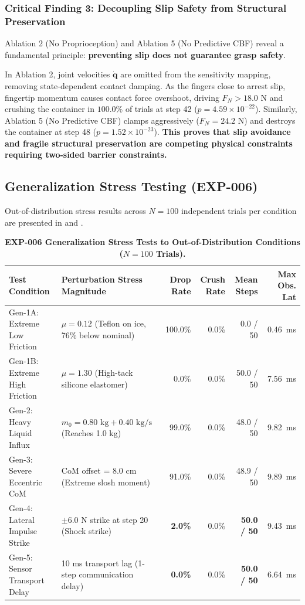 \subsubsection{Critical Finding 3: Decoupling Slip Safety from Structural Preservation}
Ablation 2 (No Proprioception) and Ablation 5 (No Predictive CBF) reveal a fundamental principle: \textbf{preventing slip does not guarantee grasp safety}.

In Ablation 2, joint velocities $\dot{\mathbf{q}}$ are omitted from the sensitivity mapping, removing state-dependent contact damping. As the fingers close to arrest slip, fingertip momentum causes contact force overshoot, driving $F_N > 18.0\text{ N}$ and crushing the container in $100.0\%$ of trials at step 42 ($p = 4.59 \times 10^{-22}$). Similarly, Ablation 5 (No Predictive CBF) clamps aggressively ($F_N = 24.2\text{ N}$) and destroys the container at step 48 ($p = 1.52 \times 10^{-23}$). \textbf{This proves that slip avoidance and fragile structural preservation are competing physical constraints requiring two-sided barrier constraints.}

\subsection{Generalization Stress Testing (EXP-006)}
Out-of-distribution stress results across $N = 100$ independent trials per condition are presented in  and .

\begin{table}[t]
\centering
\caption{\textbf{EXP-006 Generalization Stress Tests to Out-of-Distribution Conditions ($N=100$ Trials).}}
\label{tab:generalization}
\small
\begin{tabular}{llrrrr}
\toprule
\textbf{Test Condition} & \textbf{Perturbation Stress Magnitude} & \textbf{Drop Rate} & \textbf{Crush Rate} & \textbf{Mean Steps} & \textbf{Max Obs. Lat} \\
\midrule
Gen-1A: Extreme Low Friction & $\mu = 0.12$ (Teflon on ice, 76\% below nominal) & 100.0\% & 0.0\% & 0.0 / 50 & 0.46~ms \\
Gen-1B: Extreme High Friction & $\mu = 1.30$ (High-tack silicone elastomer) & 0.0\% & 0.0\% & 50.0 / 50 & 7.56~ms \\
Gen-2: Heavy Liquid Influx & $m_0 = 0.80\text{ kg} + 0.40\text{ kg/s}$ (Reaches 1.0 kg) & 99.0\% & 0.0\% & 48.0 / 50 & 9.82~ms \\
Gen-3: Severe Eccentric CoM & CoM offset = 8.0 cm (Extreme slosh moment) & 91.0\% & 0.0\% & 48.9 / 50 & 9.89~ms \\
Gen-4: Lateral Impulse Strike & $\pm 6.0\text{ N}$ strike at step 20 (Shock strike) & \textbf{2.0\%} & 0.0\% & \textbf{50.0 / 50} & 9.43~ms \\
Gen-5: Sensor Transport Delay & 10 ms transport lag (1-step communication delay) & \textbf{0.0\%} & 0.0\% & \textbf{50.0 / 50} & 6.64~ms \\
\bottomrule
\end{tabular}
\end{table}

